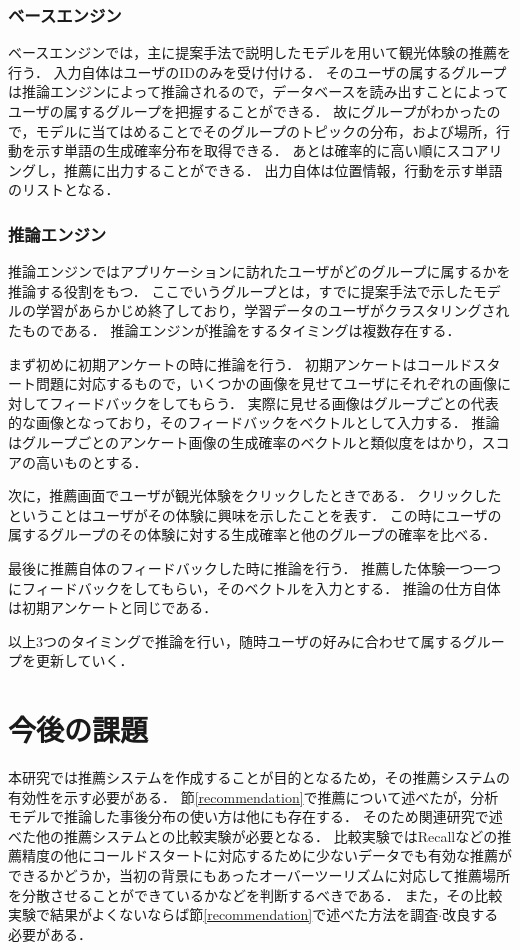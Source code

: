 \documentclass[a4j,10pt, twocolumn]{jarticle}
\begin{document}
\subsubsection{ベースエンジン}
ベースエンジンでは，主に提案手法で説明したモデルを用いて観光体験の推薦を行う．
入力自体はユーザのIDのみを受け付ける．
そのユーザの属するグループは推論エンジンによって推論されるので，データベースを読み出すことによってユーザの属するグループを把握することができる．
故にグループがわかったので，モデルに当てはめることでそのグループのトピックの分布，および場所，行動を示す単語の生成確率分布を取得できる．
あとは確率的に高い順にスコアリングし，推薦に出力することができる．
出力自体は位置情報，行動を示す単語のリストとなる．

\subsubsection{推論エンジン}
推論エンジンではアプリケーションに訪れたユーザがどのグループに属するかを推論する役割をもつ．
ここでいうグループとは，すでに提案手法で示したモデルの学習があらかじめ終了しており，学習データのユーザがクラスタリングされたものである．
推論エンジンが推論をするタイミングは複数存在する．

まず初めに初期アンケートの時に推論を行う．
初期アンケートはコールドスタート問題に対応するもので，いくつかの画像を見せてユーザにそれぞれの画像に対してフィードバックをしてもらう．
実際に見せる画像はグループごとの代表的な画像となっており，そのフィードバックをベクトルとして入力する．
推論はグループごとのアンケート画像の生成確率のベクトルと類似度をはかり，スコアの高いものとする．

次に，推薦画面でユーザが観光体験をクリックしたときである．
クリックしたということはユーザがその体験に興味を示したことを表す．
この時にユーザの属するグループのその体験に対する生成確率と他のグループの確率を比べる．

最後に推薦自体のフィードバックした時に推論を行う．
推薦した体験一つ一つにフィードバックをしてもらい，そのベクトルを入力とする．
推論の仕方自体は初期アンケートと同じである．

以上3つのタイミングで推論を行い，随時ユーザの好みに合わせて属するグループを更新していく．


\section{今後の課題} \label{future_work}
本研究では推薦システムを作成することが目的となるため，その推薦システムの有効性を示す必要がある．
節\ref{recommendation}で推薦について述べたが，分析モデルで推論した事後分布の使い方は他にも存在する．
そのため関連研究で述べた他の推薦システムとの比較実験が必要となる．
比較実験ではRecallなどの推薦精度の他にコールドスタートに対応するために少ないデータでも有効な推薦ができるかどうか，当初の背景にもあったオーバーツーリズムに対応して推薦場所を分散させることができているかなどを判断するべきである．
また，その比較実験で結果がよくないならば節\ref{recommendation}で述べた方法を調査$\cdot $改良する必要がある．
\end{document}
